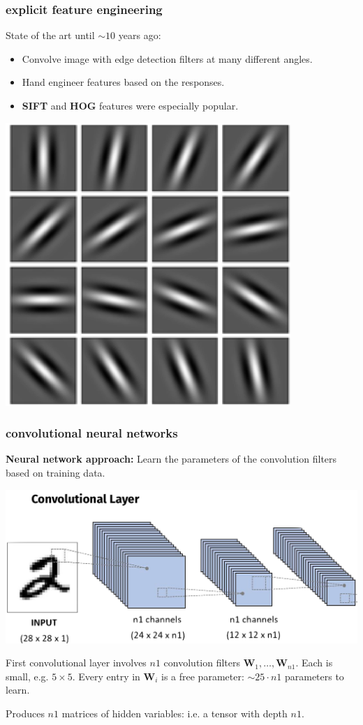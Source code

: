 \documentclass[handout,compress]{beamer}
\newcommand{\bv}[1]{\mathbf{#1}}
\begin{document}
	\begin{frame}
	\frametitle{explicit feature engineering}
	State of the art until $\sim 10$ years ago:
	\begin{itemize}
		\item Convolve image with edge detection filters at many different angles.
		\item Hand engineer features based on the responses. 
		\item \textbf{SIFT} and \textbf{HOG} features were especially popular. 
	\end{itemize}
\begin{center}
	\includegraphics[width=.3\textwidth]{filter_bank.png}
\end{center}
	\end{frame}

	\begin{frame}
	\frametitle{convolutional neural networks}
	\small
	\textbf{Neural network approach:} Learn the parameters of the convolution filters based on training data. 
	\begin{center}
		\includegraphics[width=.7\textwidth]{conv_net1.png}
	\end{center}
	First convolutional layer involves $n1$ convolution filters $\bv{W}_1, \ldots, \bv{W}_{n1}$. Each is small, e.g. $5\times 5$. Every entry in $\bv{W}_i$ is a free parameter: $\sim 25\cdot n1$ parameters to learn. 
	
	Produces $n1$ matrices of hidden variables: i.e. a tensor with depth $n1$.
	\end{frame}
\end{document}
